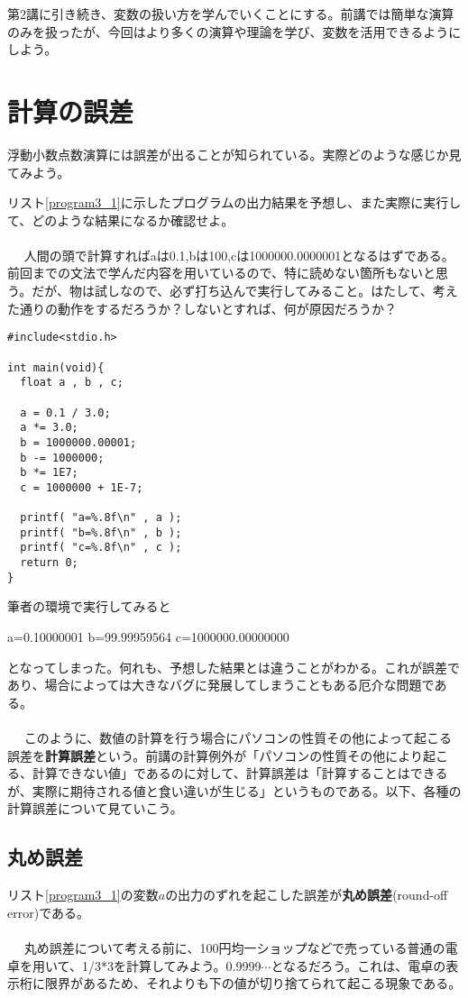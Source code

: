 第2講に引き続き、変数の扱い方を学んでいくことにする。前講では簡単な演算のみを扱ったが、今回はより多くの演算や理論を学び、変数を活用できるようにしよう。
\section{計算の誤差}
浮動小数点数演算には誤差が出ることが知られている。実際どのような感じか見てみよう。
\begin{boxnote}
\begin{multicols}{2}
リスト\ref{program3_1}に示したプログラムの出力結果を予想し、また実際に実行して、どのような結果になるか確認せよ。
\\ \\　
人間の頭で計算すればaは0.1,bは100,cは1000000.0000001となるはずである。前回までの文法で学んだ内容を用いているので、特に読めない箇所もないと思う。だが、物は試しなので、必ず打ち込んで実行してみること。はたして、考えた通りの動作をするだろうか？しないとすれば、何が原因だろうか？
\begin{lstlisting}[caption=様々な誤差,label=program3_1]
#include<stdio.h>

int main(void){
  float a , b , c;
  
  a = 0.1 / 3.0;
  a *= 3.0;
  b = 1000000.00001;
  b -= 1000000;
  b *= 1E7;
  c = 1000000 + 1E-7;

  printf( "a=%.8f\n" , a );
  printf( "b=%.8f\n" , b );
  printf( "c=%.8f\n" , c );
  return 0;
}
\end{lstlisting}
\end{multicols}
\end{boxnote}

筆者の環境で実行してみると
\begin{code}
a=0.10000001
b=99.99959564
c=1000000.00000000
\end{code}
となってしまった。何れも、予想した結果とは違うことがわかる。これが誤差であり、場合によっては大きなバグに発展してしまうこともある厄介な問題である。
\\ \\　
このように、数値の計算を行う場合にパソコンの性質その他によって起こる誤差を\textbf{計算誤差}という。前講の計算例外が「パソコンの性質その他により起こる、計算できない値」であるのに対して、計算誤差は「計算することはできるが、実際に期待される値と食い違いが生じる」というものである。以下、各種の計算誤差について見ていこう。
\subsection{丸め誤差}
リスト\ref{program3_1}の変数$a$の出力のずれを起こした誤差が\textbf{丸め誤差}(round-off error)である。
\\ \\　
丸め誤差について考える前に、100円均一ショップなどで売っている普通の電卓を用いて、1/3*3を計算してみよう。0.9999$\cdots$となるだろう。これは、電卓の表示桁に限界があるため、それよりも下の値が切り捨てられて起こる現象である。

